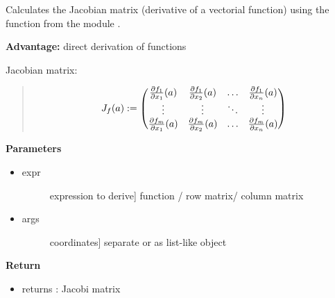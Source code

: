 \documentclass[letterpaper,10pt,english]{sphinxmanual}
\begin{document}
\begin{fulllineitems}
\label{pycontroltools:auxfuncs.math.miscmath.jac}
Calculates the Jacobian matrix (derivative of a vectorial function)
using the  function from the module
.

\textbf{Advantage:} direct derivation of functions

Jacobian matrix:
\begin{quote}
\begin{gather}
\begin{split}J_f(a) :=  \left(\begin{matrix} 
            \frac{\partial f_1}{\partial x_1}(a) &
            \frac{\partial f_1}{\partial x_2}(a) &
            \ldots &
            \frac{\partial f_1}{\partial x_n}(a)\\
            \vdots & \vdots & \ddots & \vdots \\
            \frac{\partial f_m}{\partial x_1}(a) &
            \frac{\partial f_m}{\partial x_2}(a) & \ldots &
            \frac{\partial f_m}{\partial x_n}(a)
            \end{matrix}\right)\end{split}\notag
\end{gather}\end{quote}

\textbf{Parameters}
\begin{itemize}
\item {} \begin{description}
\item[{expr}] \leavevmode{[}expression to derive{]}
function / row matrix/ column matrix

\end{description}

\item {} \begin{description}
\item[{args}] \leavevmode{[}coordinates{]}
separate or as list-like object

\end{description}

\end{itemize}

\textbf{Return}
\begin{itemize}
\item {} 
returns : Jacobi matrix


\end{itemize}
\end{fulllineitems}
\end{document}
